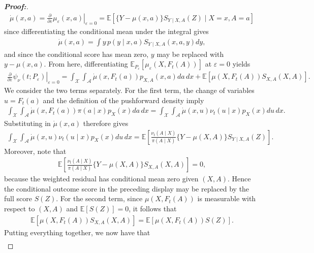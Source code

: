 \documentclass[11pt,twoside]{article}
\theoremstyle{definition}
\theoremstyle{remark}
\begin{document}
\begin{proof}[\textbf{Proof:}]
\begin{align*}
    \dot\mu(x,a) = \left. \frac{\partial}{\partial\varepsilon} \mu_\varepsilon(x,a) \right|_{\varepsilon=0} = \mathbb{E}\left[\{Y-\mu(x,a)\} S_{Y\mid X,A}(Z) \mid X=x,A=a \right]
\end{align*}
since differentiating the conditional mean under the integral gives
\begin{align*}
    \dot\mu(x,a) = \int y\,p(y\mid x,a)S_{Y\mid X,A}(x,a,y)dy,
\end{align*}
and since the conditional score has mean zero, $y$ may be replaced with $y-\mu(x,a)$. From here, differentiating $\mathbb{E}_{P_\varepsilon} \! \left[ \mu_\varepsilon(X,F_t(A))\right]$ at $\varepsilon=0$ yields
\begin{align*}
    \left. \frac{\partial}{\partial\varepsilon} \psi_\nu(t;P_\varepsilon) \right|_{\varepsilon=0} =\int_{\mathcal{X}} \int_{\mathcal{A}} \dot\mu(x,F_t(a)) p_{X,A}(x,a) da\,dx + \mathbb{E}\left[\mu(X,F_t(A))S_{X,A}(X,A) \right].
\end{align*}
We consider the two terms separately. For the first term, the change of variables $u=F_t(a)$ and the definition of the pushforward density imply
\begin{align*}
    \int_{\mathcal{X}} \int_{\mathcal{A}} \dot\mu(x,F_t(a)) \pi(a\mid x)p_X(x) da\,dx = \int_{\mathcal{X}} \int_{\mathcal{A}} \dot\mu(x,u) \nu_t(u\mid x)p_X(x) du\,dx.
\end{align*}
Substituting in $\dot\mu(x,a)$ therefore gives
\begin{align*}
    \int_{\mathcal{X}} \int_{\mathcal{A}} \dot\mu(x,u) \nu_t(u\mid x)p_X(x) du\,dx = \mathbb{E}\left[ \frac{\nu_t(A\mid X)}{\pi(A\mid X)} \{Y-\mu(X,A)\} S_{Y\mid X,A}(Z) \right].
\end{align*}
Moreover, note that
\begin{align*}
    \mathbb{E}\left[\frac{\nu_t(A\mid X)}{\pi(A\mid X)}\{Y-\mu(X,A)\}S_{X,A}(X,A)\right] =0,
\end{align*}
because the weighted residual has conditional mean zero given $(X,A)$. Hence the conditional outcome score in the preceding display may be replaced by the full score $S(Z)$. For the second term, since
$\mu(X,F_t(A))$ is measurable with respect to $(X,A)$ and $\mathbb{E}[S(Z)]=0$, it follows that
\begin{align*}
    \mathbb{E}\left[ \mu(X,F_t(A)) S_{X,A}(X,A)\right] =
    \mathbb{E}\left[\mu(X,F_t(A))S(Z)\right].
\end{align*}
Putting everything together, we now have that
\begin{align*}

\end{align*}
\end{proof}
\end{document}
